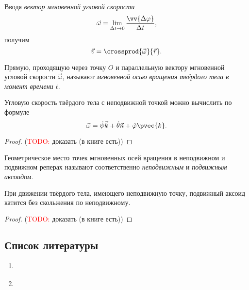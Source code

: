 Вводя \textit{вектор мгновенной угловой скорости}
\begin{equation*}
  \vec{\omega} = \lim_{\Delta t \to 0} \frac{\vv{\Delta \varphi}}{\Delta t},
\end{equation*}
получим
\begin{equation*}
  \vec{v} = \crossprod{\vec{\omega}}{\vec{r}}.
\end{equation*}

\begin{definition}
  Прямую, проходящую через точку $O$ и параллельную вектору мгновенной угловой
  скорости $\vec{\omega}$, называют \textit{мгновенной осью вращения твёрдого
  тела в момент времени $t$}.
\end{definition}

\begin{theorem}
  Угловую скорость твёрдого тела с неподвижной точкой можно вычислить по формуле
  \begin{equation}
    \label{eq:immovable_point_angular_velocity}
    \vec{\omega} = \dot{\psi} \vec{k} + \dot{\theta} \vec{n} + \dot{\varphi}
      \pvec{k}.
  \end{equation}
\end{theorem}

\begin{proof}
  (\textcolor{red}{TODO:} доказать (в книге есть))
\end{proof}

\begin{definition}
  Геометрическое место точек мгновенных осей вращения в неподвижном и подвижном
  реперах называют соответственно \textit{неподвижным} и \textit{подвижным
  аксоидом}.
\end{definition}

\begin{theorem}[Пуансо]
  При движении твёрдого тела, имеющего неподвижную точку, подвижный аксоид
  катится без скольжения по неподвижному.
\end{theorem}

\begin{proof}
  (\textcolor{red}{TODO:} доказать (в книге есть))
\end{proof}

\subsection{Список литературы}
\begin{enumerate}
  \item \cite{lectures}
  \item \cite{lourie}
\end{enumerate}

